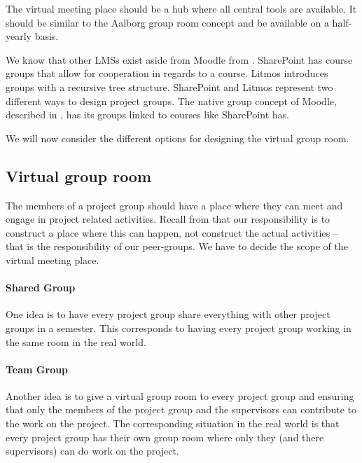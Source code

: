 The virtual meeting place should be a hub where all central tools are available. 
It should be similar to the Aalborg group room concept and be available on a half-yearly basis.  

We know that other LMSs exist aside from Moodle from . 
SharePoint has course groups that allow for cooperation in regards to a course. 
Litmos introduces groups with a recursive tree structure. 
SharePoint and Litmos represent two different ways to design project groups. 
The native group concept of Moodle, described in , has its groups linked to courses like SharePoint has.   
\\




We will now consider the different options for designing the virtual group room.

\subsection{Virtual group room}
The members of a project group should have a place where they can meet and engage in project related activities.
Recall from  that our responsibility is to construct a place where this can happen, not construct the actual activities -- that is the responsibility of our peer-groups.
We have to decide the scope of the virtual meeting place.

\paragraph{Shared Group} One idea is to have every project group share everything with other project groups in a semester.
This corresponds to having every project group working in the same room in the real world.

\paragraph{Team Group} Another idea is to give a virtual group room to every project group and ensuring that only the members of the project group and the supervisors can contribute to the work on the project.
The corresponding situation in the real world is that every project group has their own group room where only they (and there supervisors) can do work on the project. \\


